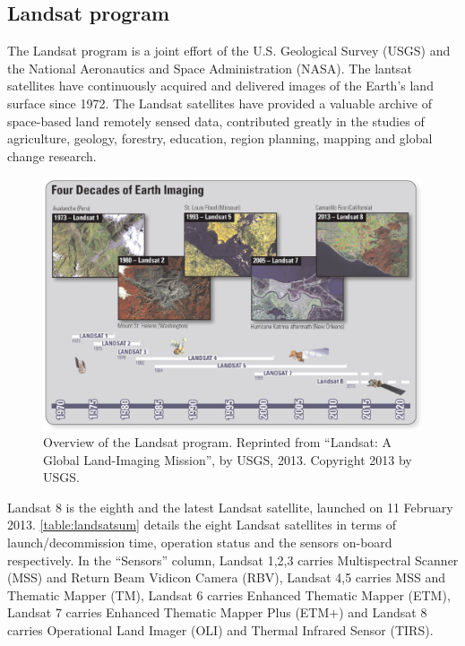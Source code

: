 \subsection{Landsat program}
The Landsat program is a joint effort of the U.S. Geological Survey (USGS) and the National Aeronautics and Space Administration (NASA). The lantsat satellites have continuously acquired and delivered images of the Earth's land surface since 1972\citep{Mission2013}. The Landsat satellites have provided a valuable archive of space-based land remotely sensed data, contributed greatly in the studies of agriculture, geology, forestry, education, region planning, mapping and global change research.\\
\begin{figure}[bth]
\begin{center}
\includegraphics[width=.95\linewidth]{gfx/landsat}
\end{center}
\caption{Overview of the Landsat program. Reprinted from ``Landsat: A Global Land-Imaging Mission'', by USGS, 2013. Copyright 2013 by USGS.  }
\label{fig:landsat4decades}
\end{figure}
\newline
Landsat 8 is the eighth and the latest Landsat satellite, launched on 11 February 2013. \autoref{table:landsatsum} details the eight Landsat satellites in terms of launch/decommission time, operation status and the sensors on-board respectively. In the ``Sensors'' column, Landsat 1,2,3 carries Multispectral Scanner (MSS) and Return Beam Vidicon Camera (RBV), Landsat 4,5 carries MSS and Thematic Mapper (TM), Landsat 6 carries Enhanced Thematic Mapper (ETM), Landsat 7 carries Enhanced Thematic Mapper Plus (ETM+) and Landsat 8 carries Operational Land Imager (OLI) and Thermal Infrared Sensor (TIRS).\\
